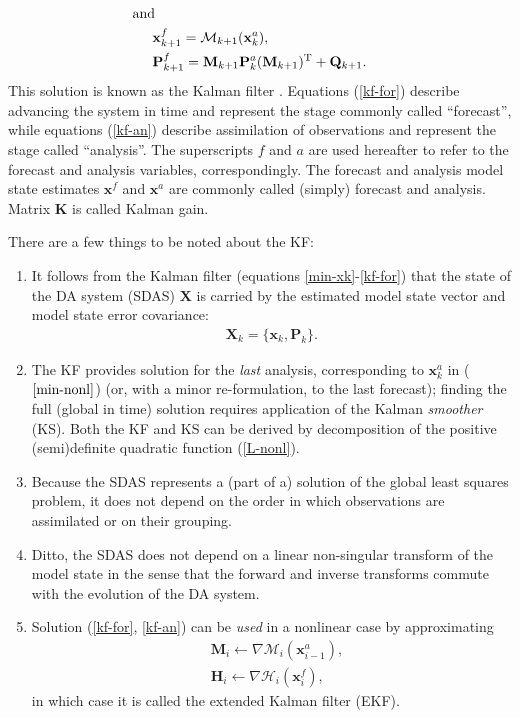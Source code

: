 \documentclass[11pt]{report}
\newcommand{\mb} {\mathbf}
\newcommand{\T}{^{\tiny \mathrm T}}
\begin{document}
\vspace{-10mm}
\begin{subequations}
  \label{kf-for}
  \begin{align}
    \label{prop-x}
    \nonumber
    & \hspace{-0.5cm} \text{and}\\
    & \mb x^f_{k+1} = \mathcal M_{k+1}(\mb x_k^a),\\
    \label{prop-P}
    & \mb P_{k+1}^f = \mb M_{k+1} \mb P_k^a (\mb M_{k+1})\T + \mb Q_{k+1}.
  \end{align}
\end{subequations}
This solution is known as the Kalman filter \citep[KF,][]{kal60}.
Equations (\ref{kf-for}) describe advancing the system in time and represent the stage commonly called ``forecast'', while equations (\ref{kf-an}) describe assimilation of observations and represent the stage called ``analysis''.
The superscripts $f$ and $a$ are used hereafter to refer to the forecast and analysis variables, correspondingly.
The forecast and analysis model state estimates $\mb x^f$ and $\mb x^a$ are commonly called (simply) forecast and analysis.
Matrix $\mb K$ is called Kalman gain.

There are a few things to be noted about the KF:
\begin{enumerate}
\item It follows from the Kalman filter (equations \ref{min-xk}-\ref{kf-for}) that the state of the DA system (SDAS) $\mb X$ is carried by the estimated model state vector and model state error covariance:
\begin{align}
  \label{sdas}
  \mb X_k = \{\mb x_k, \mb P_k\}.
\end{align}
\item The KF provides solution for the \emph{last} analysis, corresponding to $\mb x_k^a$ in ($\ref{min-nonl}$) (or, with a minor re-formulation, to the last forecast); finding the full (global in time) solution requires application of the Kalman \emph{smoother} (KS).
Both the KF and KS can be derived by decomposition of the positive (semi)definite quadratic function (\ref{L-nonl}).
\item Because the SDAS represents a (part of a) solution of the global least squares problem, it does not depend on the order in which observations are assimilated or on their grouping.
\item Ditto, the SDAS does not depend on a linear non-singular transform of the model state in the sense that the forward and inverse transforms commute with the evolution of the DA system.
\item Solution (\ref{kf-for}, \ref{kf-an}) can be \emph{used} in a nonlinear case by approximating
\begin{align*}
  &\mb M_{i} \leftarrow \nabla \mathcal M_i(\mb x_{i-1}^a),\\
  &\mb H_{i} \leftarrow \nabla \mathcal H_i(\mb x_i^f),
\end{align*}
in which case it is called the extended Kalman filter (EKF).
\end{enumerate}
\end{document}
